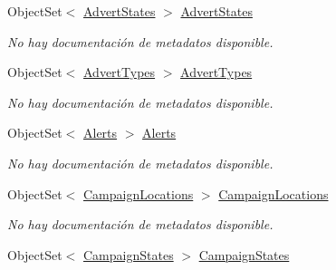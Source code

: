 \begin{DoxyCompactItemize}
Object\-Set$<$ \hyperlink{class_microsoft_1_1_samples_1_1_kinect_1_1_basic_interactions_1_1_advert_states}{Advert\-States} $>$ \hyperlink{class_microsoft_1_1_samples_1_1_kinect_1_1_basic_interactions_1_1_o_m_k_t_d_b_entities_a15ece301a65add36af96d8b5b5c7e23f}{Advert\-States}
\begin{DoxyCompactList}\small\item\em No hay documentación de metadatos disponible. \end{DoxyCompactList}\item 
Object\-Set$<$ \hyperlink{class_microsoft_1_1_samples_1_1_kinect_1_1_basic_interactions_1_1_advert_types}{Advert\-Types} $>$ \hyperlink{class_microsoft_1_1_samples_1_1_kinect_1_1_basic_interactions_1_1_o_m_k_t_d_b_entities_af2e74ed722002a04362faa57d18efdda}{Advert\-Types}
\begin{DoxyCompactList}\small\item\em No hay documentación de metadatos disponible. \end{DoxyCompactList}\item 
Object\-Set$<$ \hyperlink{class_microsoft_1_1_samples_1_1_kinect_1_1_basic_interactions_1_1_alerts}{Alerts} $>$ \hyperlink{class_microsoft_1_1_samples_1_1_kinect_1_1_basic_interactions_1_1_o_m_k_t_d_b_entities_ab29409e528e8366f1fa5bc37497bf7b9}{Alerts}
\begin{DoxyCompactList}\small\item\em No hay documentación de metadatos disponible. \end{DoxyCompactList}\item 
Object\-Set$<$ \hyperlink{class_microsoft_1_1_samples_1_1_kinect_1_1_basic_interactions_1_1_campaign_locations}{Campaign\-Locations} $>$ \hyperlink{class_microsoft_1_1_samples_1_1_kinect_1_1_basic_interactions_1_1_o_m_k_t_d_b_entities_ade222f9935d290d49d9198a649d8396c}{Campaign\-Locations}
\begin{DoxyCompactList}\small\item\em No hay documentación de metadatos disponible. \end{DoxyCompactList}\item 
Object\-Set$<$ \hyperlink{class_microsoft_1_1_samples_1_1_kinect_1_1_basic_interactions_1_1_campaign_states}{Campaign\-States} $>$ \hyperlink{class_microsoft_1_1_samples_1_1_kinect_1_1_basic_interactions_1_1_o_m_k_t_d_b_entities_afc4b5f54c768115ec2caf5ff541cc978}{Campaign\-States}

\end{DoxyCompactItemize}
